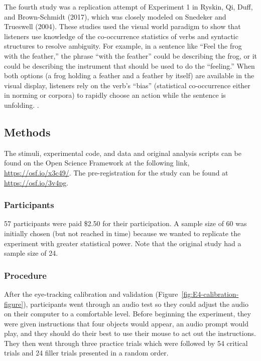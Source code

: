 \documentclass[
  man,floatsintext]{apa6}
\begin{document}
The fourth study was a replication attempt of Experiment 1 in
Ryskin, Qi, Duff, and Brown-Schmidt (2017), which was closely modeled on
Snedeker and Trueswell (2004). These studies used the
visual world paradigm to show that listeners use knowledge of the
co-occurrence statistics of verbs and syntactic structures to resolve
ambiguity. For example, in a sentence like ``Feel the frog with the
feather,'' the phrase ``with the feather'' could be describing the frog, or
it could be describing the instrument that should be used to do the
``feeling.'' When both options (a frog holding a feather and a feather by
itself) are available in the visual display, listeners rely on the
verb's ``bias'' (statistical co-occurrence either in norming or corpora)
to rapidly choose an action while the sentence is unfolding. .

\hypertarget{methods-3}{%
\subsection{Methods}\label{methods-3}}

The stimuli, experimental code, and data and original analysis scripts can be
found on the Open Science Framework at the following link,
\url{https://osf.io/x3c49/}. The pre-registration
for the study can be found at \url{https://osf.io/3v4pg}.

\hypertarget{participants-4}{%
\subsubsection{Participants}\label{participants-4}}

57 participants were paid \$2.50 for their participation. A sample size of 60 was initially chosen (but not reached in time) because we wanted to replicate the experiment with greater statistical power. Note that the original study had a sample size of 24.

\hypertarget{procedure-3}{%
\subsubsection{Procedure}\label{procedure-3}}

After the eye-tracking calibration and validation (Figure~\ref{fig:E4-calibration-figure}), participants went through an audio
test so they could adjust the audio on their computer to a comfortable
level. Before beginning the experiment, they were given instructions
that four objects would appear, an audio prompt would play, and they
should do their best to use their mouse to act out the instructions.
They then went through three practice trials which were followed by 54
critical trials and 24 filler trials presented in a random order.
\end{document}
